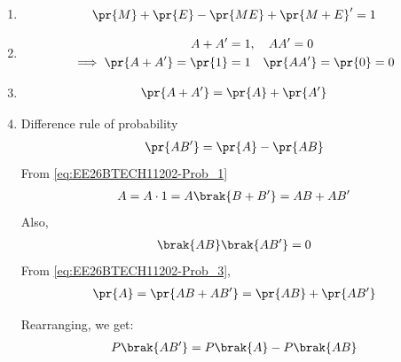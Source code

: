 \begin{enumerate}[label=\thesubsection.\arabic*, ref=\thesubsection.\theenumi]
\item 
\begin{align}
\pr{M} + \pr{E} - \pr{ME} + \pr{M + E}^{\prime} = 1 \label{eq:EE26BTECH11202-addition_theorem_probability}
\end{align}
\item 
\begin{align}
	A + A^{\prime} &= 1, \quad AA^{\prime} = 0 \label{eq:EE26BTECH11202-Prob_1}
	\\
	\implies \pr{A + A^{\prime}} = \pr{1}&= 1  \quad \pr{AA^{\prime}} =\pr{0}= 0
\label{eq:EE26BTECH11202-Prob_2}
\end{align}
\item 
\begin{align}
	\pr{A + A^{\prime}} = \pr{A} + \pr{A^{\prime}} \label{eq:EE26BTECH11202-Prob_3}
\end{align}
\item Difference rule of probability
	\begin{align}
{\pr{AB^{\prime}} = \pr{A} - \pr{AB}}
	\end{align}
\solution
From \eqref{eq:EE26BTECH11202-Prob_1}
\begin{align}
A = A \cdot 1 = A\brak{B + B^{\prime}}
 = AB + AB^{\prime}
\end{align}
Also, 
\begin{align}
\brak{AB}\brak{AB^{\prime}} = 0
\end{align}
From \eqref{eq:EE26BTECH11202-Prob_3},
\begin{align}
\pr{A} = \pr{AB + AB^{\prime}} = \pr{AB} + \pr{AB^{\prime}}
\end{align}

Rearranging, we get:
\begin{align}
{P\brak{AB^{\prime}} = P\brak{A} - P\brak{AB}}
\end{align}


\end{enumerate}
